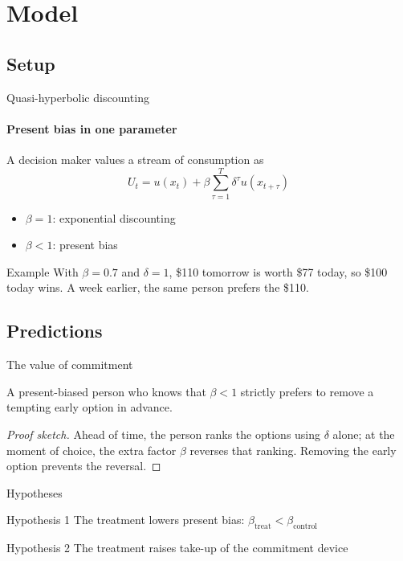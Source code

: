 \documentclass[
    aspectratio=169,11pt,t,
]{beamer}
\begin{document}
\section{Model}
\subsection{Setup}

\begin{frame}{Quasi-hyperbolic discounting}
  \framesubtitle{Present bias in one parameter}
  A decision maker values a stream of consumption as
  \[
    U_t = u(x_t) + \beta \sum_{\tau=1}^{T} \delta^\tau u(x_{t+\tau})
  \]
  \begin{itemize}
    \item $\beta = 1$: exponential discounting
    \item $\beta < 1$: present bias
  \end{itemize}
  \begin{exampleblock}{Example}
    With $\beta = 0.7$ and $\delta = 1$, \$110 tomorrow is worth \$77 today,
    so \$100 today wins. A week earlier, the same person prefers the \$110.
  \end{exampleblock}
\end{frame}

\subsection{Predictions}

\begin{frame}{The value of commitment}
  \begin{theorem}
    A present-biased person who knows that $\beta < 1$ strictly prefers to
    remove a tempting early option in advance.
  \end{theorem}
  \begin{proof}[Proof sketch]
    Ahead of time, the person ranks the options using $\delta$ alone; at the
    moment of choice, the extra factor $\beta$ reverses that ranking.
    Removing the early option prevents the reversal.
  \end{proof}
\end{frame}

\begin{frame}{Hypotheses}
  \begin{block}{Hypothesis 1}
    The treatment lowers present bias:
    $\beta_{\text{treat}} < \beta_{\text{control}}$
  \end{block}
  \pause
  \begin{block}{Hypothesis 2}
    The treatment raises take-up of the commitment device
  \end{block}
\end{frame}
\end{document}
